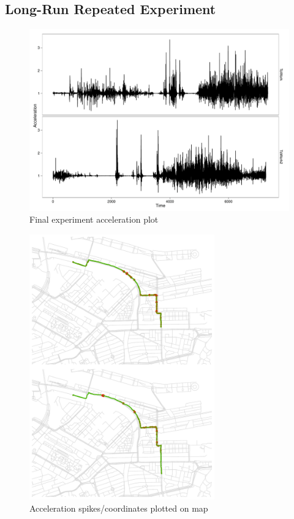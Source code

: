 \documentclass[a4paper,11pt]{article}
\begin{document}
\subsection{Long-Run Repeated Experiment}






\begin{figure}
\centering
\includegraphics[width=13cm]{figures/accelerationplot-longtrack}
\caption{Final experiment acceleration plot}
\label{fig:accplotlong}
\end{figure}




\begin{figure}
\centering
\includegraphics[width=8cm]{figures/map}
\caption{Acceleration spikes/coordinates plotted on map}
\label{fig:map}
\end{figure}
\end{document}
